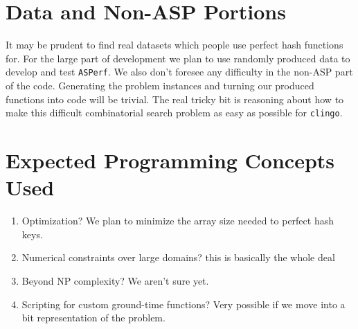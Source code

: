 \documentclass{article}
\begin{document}
\section{Data and Non-ASP Portions}

It may be prudent to find real datasets which people use perfect hash functions for. For the large part of development we plan to use randomly produced data to develop and test \texttt{ASPerf}. We also don't foresee any difficulty in the non-ASP part of the code. Generating the problem instances and turning our produced functions into code will be trivial. The real tricky bit is reasoning about how to make this difficult combinatorial search problem as easy as possible for \texttt{clingo}.

\section{Expected Programming Concepts Used}

\begin{enumerate}
\item Optimization? We plan to minimize the array size needed to perfect hash keys.
\item Numerical constraints over large domains? this is basically the whole deal
\item Beyond NP complexity? We aren't sure yet.
\item Scripting for custom ground-time functions? Very possible if we move into a bit representation of the problem.
\end{enumerate}
\end{document}
